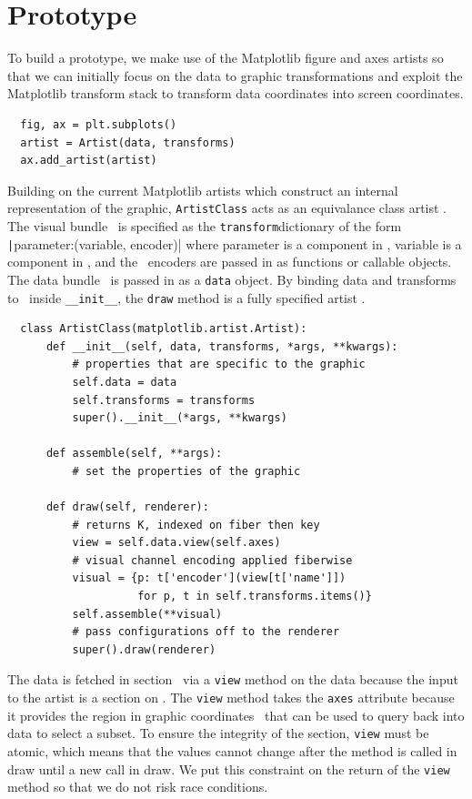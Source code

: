 \documentclass[journal]{vgtc}                %
\begin{document}
\section{Prototype}
To build a prototype, we make use of the Matplotlib figure and axes artists \cite{hunterArchitectureOpenSource,hunterMatplotlib2DGraphics2007} so that we can initially focus on the data to graphic transformations and exploit the Matplotlib transform stack to transform data coordinates into screen coordinates.
\begin{verbatim}
  fig, ax = plt.subplots()
  artist = Artist(data, transforms)
  ax.add_artist(artist)
\end{verbatim}
Building on the current Matplotlib artists which construct an internal representation of the graphic, \texttt{ArtistClass} acts as an equivalance class artist \vartisteq. The visual bundle \vtotal\ is specified as the \texttt{transform}dictionary of the form \texttt|{parameter:(variable, encoder)}| where parameter is a component in \vfiber, variable is a component in \dfiber,  and the \vchannel\ encoders are passed in as functions or callable objects. The data bundle \dtotal\ is passed in as a \texttt{data} object. By binding data and transforms to \vartisteq\ inside \texttt{__init__}, the \texttt{draw} method is a fully specified artist \vartist.
\begin{verbatim}
  class ArtistClass(matplotlib.artist.Artist):
      def __init__(self, data, transforms, *args, **kwargs):
          # properties that are specific to the graphic
          self.data = data 
          self.transforms = transforms
          super().__init__(*args, **kwargs)
  
      def assemble(self, **args):
          # set the properties of the graphic
  
      def draw(self, renderer):
          # returns K, indexed on fiber then key 
          view = self.data.view(self.axes) 
          # visual channel encoding applied fiberwise 
          visual = {p: t['encoder'](view[t['name']])
                    for p, t in self.transforms.items()}
          self.assemble(**visual)
          # pass configurations off to the renderer
          super().draw(renderer)
  \end{verbatim}
 The data is fetched in section \dsection\ via a \texttt{view} method on the data because the input to the artist is a section on \dtotal. The \texttt{view} method takes the \texttt{axes} attribute because it provides the region in graphic coordinates \gbase\ that can be used to query back into data to select a subset. To ensure the integrity of the section, \texttt{view} must be atomic, which means that the values cannot change after the method is called in draw until a new call in draw. We put this constraint on the return of the \texttt{view} method so that we do not risk race conditions. 
 
\end{document}
